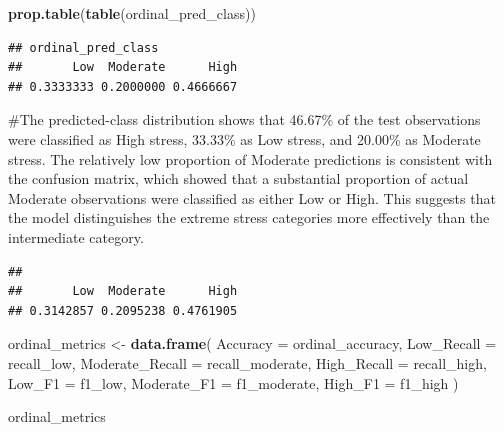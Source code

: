 \documentclass[
]{article}
\newenvironment{Shaded}{\begin{snugshade}}{\end{snugshade}}
\newcommand{\AttributeTok}[1]{\textcolor[rgb]{0.13,0.29,0.53}{#1}}
\newcommand{\FunctionTok}[1]{\textcolor[rgb]{0.13,0.29,0.53}{\textbf{#1}}}
\newcommand{\NormalTok}[1]{#1}
\newcommand{\OtherTok}[1]{\textcolor[rgb]{0.56,0.35,0.01}{#1}}
\newcommand{\SpecialCharTok}[1]{\textcolor[rgb]{0.81,0.36,0.00}{\textbf{#1}}}
\begin{document}
\begin{Shaded}
\begin{Highlighting}[]
\FunctionTok{prop.table}\NormalTok{(}\FunctionTok{table}\NormalTok{(ordinal\_pred\_class))}
\end{Highlighting}
\end{Shaded}

\begin{verbatim}
## ordinal_pred_class
##       Low  Moderate      High 
## 0.3333333 0.2000000 0.4666667
\end{verbatim}

\#The predicted-class distribution shows that 46.67\% of the test
observations were classified as High stress, 33.33\% as Low stress, and
20.00\% as Moderate stress. The relatively low proportion of Moderate
predictions is consistent with the confusion matrix, which showed that a
substantial proportion of actual Moderate observations were classified
as either Low or High. This suggests that the model distinguishes the
extreme stress categories more effectively than the intermediate
category.

\begin{Shaded}
\end{Shaded}

\begin{verbatim}
## 
##       Low  Moderate      High 
## 0.3142857 0.2095238 0.4761905
\end{verbatim}

\begin{Shaded}
\begin{Highlighting}[]
\NormalTok{ordinal\_metrics }\OtherTok{\textless{}{-}} \FunctionTok{data.frame}\NormalTok{(}
  \AttributeTok{Accuracy =}\NormalTok{ ordinal\_accuracy,}
  \AttributeTok{Low\_Recall =}\NormalTok{ recall\_low,}
  \AttributeTok{Moderate\_Recall =}\NormalTok{ recall\_moderate,}
  \AttributeTok{High\_Recall =}\NormalTok{ recall\_high,}
  \AttributeTok{Low\_F1 =}\NormalTok{ f1\_low,}
  \AttributeTok{Moderate\_F1 =}\NormalTok{ f1\_moderate,}
  \AttributeTok{High\_F1 =}\NormalTok{ f1\_high}
\NormalTok{)}

\NormalTok{ordinal\_metrics}
\end{Highlighting}
\end{Shaded}
\end{document}
